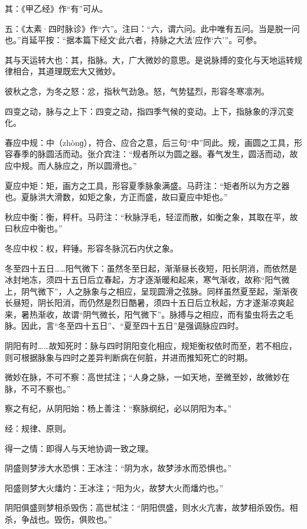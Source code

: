 \documentclass[12pt]{ctexbook}
\begin{document}
\begin{jiaozhu}
	\item 其：《甲乙经》作“有”可从。
	\item 五：《太素·四时脉诊》作“六”。注曰：“六，谓六问。此中唯有五问。当是脱一问也。”肖延平按：“据本篇下经文‘此六者，持脉之大法’应作‘六’”。可参。
	\item 其与天运转大也：其，指脉。大，广大微妙的意思。是说脉搏的变化与天地运转规律相合，其道理既宏大又微妙。
	\item 彼秋之念，为冬之怒：忿，指秋气劲急。怒，气势猛烈，形容冬寒凛冽。
	\item 四变之动，脉与之上下：四变之动，指四季气候的变动。上下，指脉象的浮沉变化。
	\item 春应中规：中（zhònɡ），符合、应合之意，后三句“中”同此。规，画圆之工具，形容春季的脉圆活而动。张介宾注：“规者所以为圆之器。春气发生，圆活而动，故应中规。而人脉应之，所以圆滑也。”
	\item 夏应中矩：矩，画方之工具，形容夏季脉象满盛。马莳注：“矩者所以为方之器也。夏脉洪大滑数，如矩之象，方正而盛，故曰夏应中矩也。”
	\item 秋应中衡：衡，秤杆。马莳注：“秋脉浮毛，轻涩而散，如衡之象，其取在平，故曰秋应中衡也。”
	\item 冬应中权：权，秤锤。形容冬脉沉石内伏之象。
	\item 冬至四十五日……阳气微下：虽然冬至日起，渐渐昼长夜短，阳长阴消，而依然是冰封地冻，须四十五日后立春起，方才逐渐暖和起来，寒气渐收，故称“阳气微上，阴气微下”，人之脉象与之相应，呈现圆滑之弦脉。同样虽然夏至起，渐渐夜长昼短，阴长阳消，而仍然是烈日酷暑，须四十五日后立秋起，方才遂渐凉爽起来，暑热渐收，故谓“阴气微长，阳气微下”。脉搏与之相应，而有蛰虫将去之毛脉。因此，言“冬至四十五日”、“夏至四十五日”是强调脉应四时。
	\item 阴阳有时……故知死时：脉与四时阴阳变化相应，规矩衡权依时而至，若不相应，则可根据脉象与四时之差异判断病在何脏，并进而推知死亡的时期。
	\item 微妙在脉，不可不察：高世拭注；“人身之脉，一如天地，至微至妙，故微妙在脉，不可不察也。”
	\item 察之有纪，从阴阳始：杨上善注：“察脉纲纪，必以阴阳为本。”
	\item 经：规律、原则。
	\item 得一之情：即得人与天地协调一致之理。
	\item 阴盛则梦涉大水恐惧：王冰注：“阴为水，故梦涉水而恐惧也。”
	\item 阳盛则梦大火燔灼：王冰注；“阳为火，故梦大火而燔灼也。”
	\item 阴阳俱盛则梦相杀毁伤：高世栻注：“阴阳倶盛，则水火亢害，故梦相杀毁伤。相杀，争战也。毁伤，俱败也。”

\end{jiaozhu}
\end{document}
